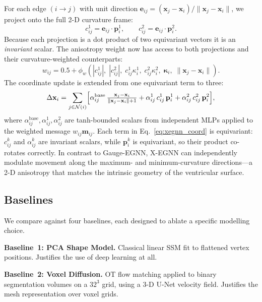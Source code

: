 \documentclass{article}
\begin{document}
For each edge $(i \to j)$ with unit direction
$\mathbf{e}_{ij} = (\mathbf{x}_j - \mathbf{x}_i)/\|\mathbf{x}_j -
\mathbf{x}_i\|$, we project onto the full 2-D curvature frame:
\begin{equation}
    c^1_{ij} = \mathbf{e}_{ij} \cdot \mathbf{p}^1_i, \qquad
    c^2_{ij} = \mathbf{e}_{ij} \cdot \mathbf{p}^2_i.
    \label{eq:xegnn_proj}
\end{equation}
Because each projection is a dot product of two equivariant vectors it is an
\emph{invariant} scalar.
The anisotropy weight now has access to both projections and their
curvature-weighted counterparts:
\[
    w_{ij} = 0.5 + \phi_w\!\left(
        |c^1_{ij}|,\; |c^2_{ij}|,\;
        c^1_{ij}\kappa^1_i,\; c^2_{ij}\kappa^2_i,\;
        \boldsymbol{\kappa}_i,\; \|\mathbf{x}_j - \mathbf{x}_i\|
    \right).
\]
The coordinate update is extended from one equivariant term to three:
\begin{equation}
    \Delta\mathbf{x}_i = \sum_{j \in \mathcal{N}(i)} \Bigl[
        \alpha^\text{base}_{ij}\,
            \tfrac{\mathbf{x}_j - \mathbf{x}_i}{\|\mathbf{x}_j - \mathbf{x}_i\| + 1}
        + \alpha^1_{ij}\, c^1_{ij}\, \mathbf{p}^1_i
        + \alpha^2_{ij}\, c^2_{ij}\, \mathbf{p}^2_i
    \Bigr],
    \label{eq:xegnn_coord}
\end{equation}
where $\alpha^\text{base}_{ij}, \alpha^1_{ij}, \alpha^2_{ij}$ are
tanh-bounded scalars from independent MLPs applied to the weighted message
$w_{ij}\mathbf{m}_{ij}$.
Each term in Eq.~\ref{eq:xegnn_coord} is equivariant: $c^k_{ij}$ and
$\alpha^k_{ij}$ are invariant scalars, while $\mathbf{p}^k_i$ is equivariant,
so their product co-rotates correctly.
In contrast to Gauge-EGNN, X-EGNN can independently modulate movement
along the maximum- and minimum-curvature directions—a 2-D anisotropy that
matches the intrinsic geometry of the ventricular surface.

\subsection{Baselines}
\label{sec:method_baselines}

We compare against four baselines, each designed to ablate a specific
modelling choice.

\textbf{Baseline~1: PCA Shape Model.}
Classical linear SSM fit to flattened vertex positions.
Justifies the use of deep learning at all.

\textbf{Baseline~2: Voxel Diffusion.}
OT flow matching applied to binary segmentation volumes on a $32^3$
grid, using a 3-D U-Net velocity field.
Justifies the mesh representation over voxel grids.
\end{document}
